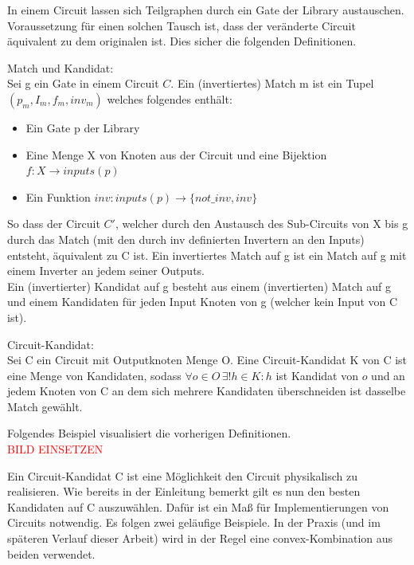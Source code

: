\documentclass[11pt, a4paper, german]{article}
\begin{document}
In einem Circuit lassen sich Teilgraphen durch ein Gate der Library austauschen. Voraussetzung für einen solchen Tausch ist, dass der veränderte Circuit äquivalent zu dem originalen ist. Dies sicher die folgenden Definitionen. 

\begin{definition}{Match und Kandidat:}\\
Sei g ein Gate in einem Circuit $C$. Ein (invertiertes) Match m ist ein Tupel $(p_m, I_m, f_m, inv_m)$ welches folgendes enthält:
\begin{itemize}
\item Ein Gate p der Library
\item Eine Menge X von Knoten aus der Circuit und eine Bijektion $ f: X \rightarrow inputs(p)$
\item Ein Funktion $ inv : inputs(p) \rightarrow \{not\_inv , inv \}$
\end{itemize}
So dass der Circuit $C'$, welcher durch den Austausch des Sub-Circuits von X bis g durch das Match (mit den durch inv definierten Invertern an den Inputs) entsteht, äquivalent zu C ist.
Ein invertiertes Match auf g ist ein Match auf g mit einem Inverter an jedem seiner Outputs.\\
Ein (invertierter) Kandidat auf g besteht aus einem (invertierten) Match auf g und einem Kandidaten für jeden Input Knoten von g (welcher kein Input von C ist).
\end{definition}

\begin{definition}{Circuit-Kandidat:}\\
Sei C ein Circuit mit Outputknoten Menge O. Eine Circuit-Kandidat K von C ist eine Menge von Kandidaten, sodass $\forall o \in O \, \exists!  h  \in K : h$ ist Kandidat von $ o$ und an jedem Knoten von C an dem sich mehrere Kandidaten überschneiden ist dasselbe Match gewählt.
\end{definition}
Folgendes Beispiel visualisiert die vorherigen Definitionen.\\
\textcolor{red}{BILD EINSETZEN}

Ein Circuit-Kandidat C ist eine Möglichkeit den Circuit physikalisch zu realisieren. Wie bereits in der Einleitung bemerkt gilt es nun den besten Kandidaten auf C auszuwählen. Dafür ist ein Maß für Implementierungen von Circuits notwendig. Es folgen zwei geläufige Beispiele. In der Praxis (und im späteren Verlauf dieser Arbeit) wird in der Regel eine convex-Kombination aus beiden verwendet.
\end{document}
